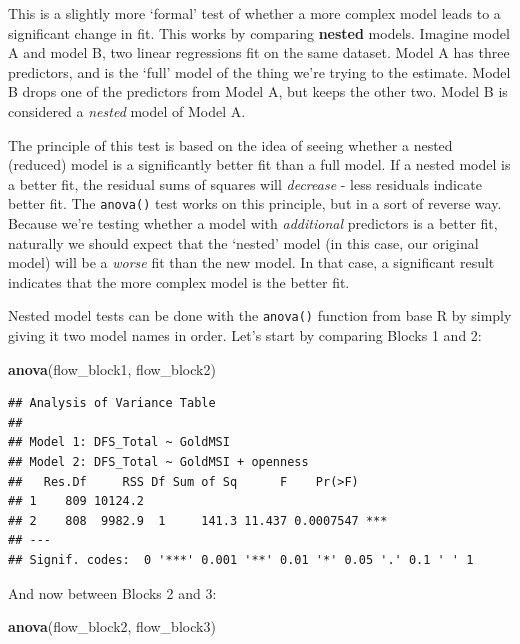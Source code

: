 \documentclass[
]{book}
\newenvironment{Shaded}{\begin{snugshade}}{\end{snugshade}}
\newcommand{\FunctionTok}[1]{\textcolor[rgb]{0.13,0.29,0.53}{\textbf{#1}}}
\newcommand{\NormalTok}[1]{#1}
\begin{document}
This is a slightly more `formal' test of whether a more complex model leads to a significant change in fit. This works by comparing \textbf{nested} models. Imagine model A and model B, two linear regressions fit on the same dataset. Model A has three predictors, and is the `full' model of the thing we're trying to the estimate. Model B drops one of the predictors from Model A, but keeps the other two. Model B is considered a \emph{nested} model of Model A.

The principle of this test is based on the idea of seeing whether a nested (reduced) model is a significantly better fit than a full model. If a nested model is a better fit, the residual sums of squares will \emph{decrease} - less residuals indicate better fit. The \texttt{anova()} test works on this principle, but in a sort of reverse way. Because we're testing whether a model with \emph{additional} predictors is a better fit, naturally we should expect that the `nested' model (in this case, our original model) will be a \emph{worse} fit than the new model. In that case, a significant result indicates that the more complex model is the better fit.

Nested model tests can be done with the \texttt{anova()} function from base R by simply giving it two model names in order. Let's start by comparing Blocks 1 and 2:

\begin{Shaded}
\begin{Highlighting}[]
\FunctionTok{anova}\NormalTok{(flow\_block1, flow\_block2)}
\end{Highlighting}
\end{Shaded}

\begin{verbatim}
## Analysis of Variance Table
## 
## Model 1: DFS_Total ~ GoldMSI
## Model 2: DFS_Total ~ GoldMSI + openness
##   Res.Df     RSS Df Sum of Sq      F    Pr(>F)    
## 1    809 10124.2                                  
## 2    808  9982.9  1     141.3 11.437 0.0007547 ***
## ---
## Signif. codes:  0 '***' 0.001 '**' 0.01 '*' 0.05 '.' 0.1 ' ' 1
\end{verbatim}

And now between Blocks 2 and 3:

\begin{Shaded}
\begin{Highlighting}[]
\FunctionTok{anova}\NormalTok{(flow\_block2, flow\_block3)}
\end{Highlighting}
\end{Shaded}
\end{document}
